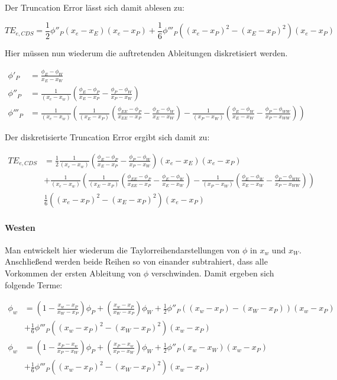 \documentclass[11pt, ngerman,colorback,accentcolor=tud2d]{tudreport}
\begin{document}
Der Truncation Error lässt sich damit ablesen zu:

\begin{equation*}
  TE_{e, CDS} =  \frac{1}{2} \phi''_P (x_e-x_E)(x_e-x_P)+ \frac{1}{6} \phi'''_P \left({(x_e-x_P)^2-(x_E-x_P)^2}\right)(x_e-x_P)
\end{equation*}


Hier müssen nun wiederum die auftretenden Ableitungen diskretisiert werden.

\begin{align}
  \phi'_P &= \frac{\phi_E-\phi_W}{x_E-x_W}\\
  \phi''_P &= \frac{1}{(x_e-x_w)} \left({\frac{\phi_E-\phi_P}{x_E-x_P}
  - \frac{\phi_P-\phi_W}{x_P-x_W} }\right) \label{eq:ddphip}\\
  \phi'''_P &= \frac{1}{(x_e-x_w)} \left({
  \frac{1}{(x_E-x_P)} \left({\frac{\phi_{EE}-\phi_P}{x_{EE}-x_P}- \frac{\phi_E-\phi_W}{x_E-x_W} }\right)-
  \frac{1}{(x_P-x_W)} \left({\frac{\phi_E-\phi_W}{x_E-x_W} - \frac{\phi_P-\phi_{WW}}{x_P-x_{WW}} }\right)
  }\right) \label{eq:dddphip}
\end{align}

Der diskretisierte Truncation Error ergibt sich damit zu:

\begin{align}
  TE_{e, CDS} &=  \frac{1}{2} \frac{1}{(x_e-x_w)} \left({\frac{\phi_E-\phi_P}{x_E-x_P}
  - \frac{\phi_P-\phi_W}{x_P-x_W} }\right) (x_e-x_E) (x_e-x_P) \nonumber \\
  &+
 \frac{1}{(x_e-x_w)} \left({
  \frac{1}{(x_E-x_P)} \left({\frac{\phi_{EE}-\phi_P}{x_{EE}-x_P}- \frac{\phi_E-\phi_W}{x_E-x_W} }\right)-
  \frac{1}{(x_P-x_W)} \left({\frac{\phi_E-\phi_W}{x_E-x_W} - \frac{\phi_P-\phi_{WW}}{x_P-x_{WW}} }\right)
  }\right) \nonumber \\
  &\frac{1}{6} \left({(x_e-x_P)^2-(x_E-x_P)^2}\right)(x_e-x_P)
\end{align}

\paragraph{Westen}

Man entwickelt hier wiederum die Taylorreihendarstellungen von $\phi$ in $x_w$ und $x_W$.
Anschließend werden beide Reihen so von einander subtrahiert, dass alle Vorkommen
der ersten Ableitung von $\phi$ verschwinden. Damit ergeben sich folgende Terme:

\begin{align*}
  \phi_w &= \left({1-\frac{x_w-x_P}{x_W-x_P}}\right)\phi_P + \left({\frac{x_w-x_P}{x_W-x_P} }\right) \phi_W
  + \frac{1}{2} \phi''_P \left({(x_w-x_P)-(x_W-x_P)}\right)(x_w-x_P)\\
  &+ \frac{1}{6} \phi'''_P \left({(x_w-x_P)^2-(x_W-x_P)^2}\right)(x_w-x_P)\\
  \phi_w &= \left({1-\frac{x_P-x_w}{x_P-x_W}}\right)\phi_P + \left({\frac{x_P-x_w}{x_P-x_W} }\right) \phi_W
  + \frac{1}{2} \phi''_P \left({x_w-x_W}\right)(x_w-x_P)\\
  &+ \frac{1}{6} \phi'''_P \left({(x_w-x_P)^2-(x_W-x_P)^2}\right)(x_w-x_P)
\end{align*}
\end{document}
